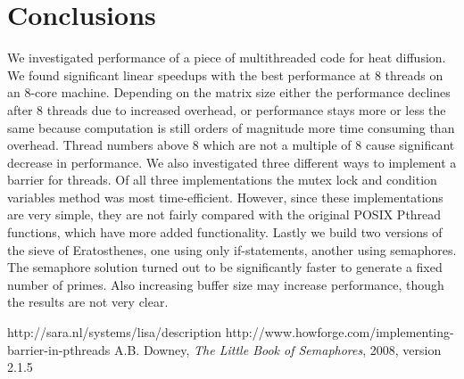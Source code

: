 \documentclass[11pt,a4paper,onecolumn]{article}
\begin{document}
\section{Conclusions}
We investigated performance of a piece of multithreaded code for heat diffusion. We found significant linear speedups with the best performance at 8 threads on an 8-core machine. Depending on the matrix size either the performance declines after 8 threads due to increased overhead, or performance stays more or less the same because computation is still orders of magnitude more time consuming than overhead. Thread numbers above 8 which are not a multiple of 8 cause significant decrease in performance. 
We also investigated three different ways to implement a barrier for threads. Of all three implementations the mutex lock and condition variables method was most time-efficient. However, since these implementations are very simple, they are not fairly compared with the original POSIX Pthread functions, which have more added functionality.
Lastly we build two versions of the sieve of Eratosthenes, one using only if-statements, another using semaphores. The semaphore solution turned out to be significantly faster to generate a fixed number of primes. Also increasing buffer size may increase performance, though the results are not very clear.

\begin{thebibliography}{7}
  http://sara.nl/systems/lisa/description
  http://www.howforge.com/implementing-barrier-in-pthreads
  A.B. Downey, \emph{The Little Book of Semaphores}, 2008, version 2.1.5
\end{thebibliography}
\end{document}
